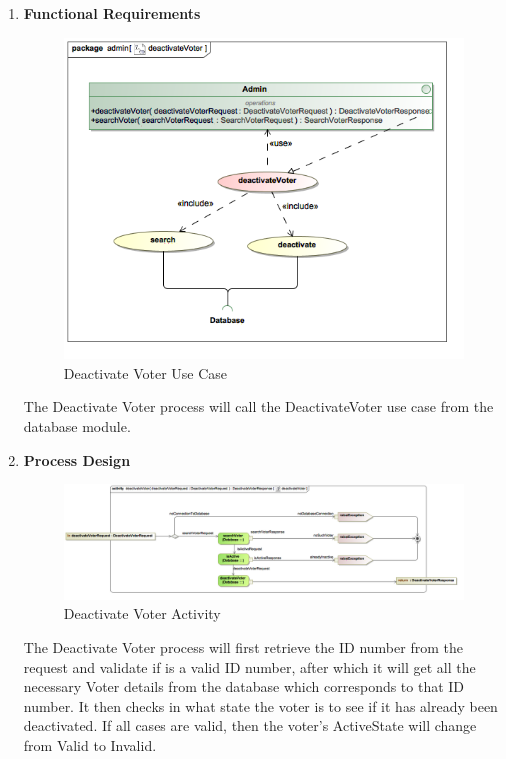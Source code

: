 \begin{enumerate}
\begin{enumerate}
			\newpage
			
			\item \textbf{Functional Requirements}
				\begin{figure}[H]
					\centering
					\includegraphics[width=0.75\linewidth]{../Images/Admin/UseCases/deactivateVoter_useCase.png}
					\caption{Deactivate Voter Use Case}
				\end{figure}
				
				The Deactivate Voter process will call the DeactivateVoter use case from the database module.
				\newline
				
			\item \textbf{Process Design}
				\begin{figure}[H]
					\centering
					\includegraphics[width=0.75\linewidth]{../Images/Admin/ActivityDiagrams/deactivateVoter_ActivityDiagram.png}
					\caption{Deactivate Voter Activity}
				\end{figure}
				
				The Deactivate Voter process will first retrieve the ID number from the request and validate if is a valid ID number, after which it will get all the necessary Voter details from the database which corresponds to that ID number. It then checks in what state the voter is to see if it has already been deactivated. If all cases are valid, then the voter's ActiveState will change from Valid to Invalid.
				\newline
				

\end{enumerate}
\end{enumerate}
